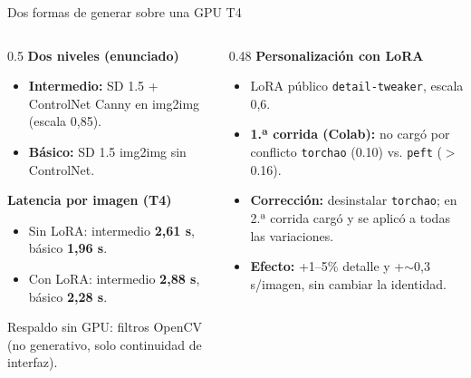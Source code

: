 \documentclass[aspectratio=169,11pt]{beamer}
\begin{document}
\begin{frame}{Dos formas de generar sobre una GPU T4}
  \begin{columns}[T]
    \begin{column}{0.5\textwidth}
      \textbf{Dos niveles (enunciado)}
      \begin{itemize}
        \item \textbf{Intermedio:} SD 1.5 + ControlNet Canny en img2img (escala 0,85).
        \item \textbf{Básico:} SD 1.5 img2img sin ControlNet.
      \end{itemize}
      \vspace{0.25em}
      \textbf{Latencia por imagen (T4)}
      \begin{itemize}
        \item Sin LoRA: intermedio \textbf{2,61 s}, básico \textbf{1,96 s}.
        \item Con LoRA: intermedio \textbf{2,88 s}, básico \textbf{2,28 s}.
      \end{itemize}
      \vspace{0.25em}
      \scriptsize Respaldo sin GPU: filtros OpenCV (no generativo, solo continuidad de interfaz).
    \end{column}
    \begin{column}{0.48\textwidth}
      \textbf{Personalización con LoRA}
      \begin{itemize}
        \item LoRA público \texttt{detail-tweaker}, escala 0,6.
        \item \textbf{1.ª corrida (Colab):} no cargó por conflicto \texttt{torchao} (0.10) vs. \texttt{peft} ($>$0.16).
        \item \textbf{Corrección:} desinstalar \texttt{torchao}; en 2.ª corrida cargó y se aplicó a todas las variaciones.
        \item \textbf{Efecto:} +1--5\% detalle y +$\sim$0,3 s/imagen, sin cambiar la identidad.
      \end{itemize}
    \end{column}
  \end{columns}
\end{frame}
\end{document}
